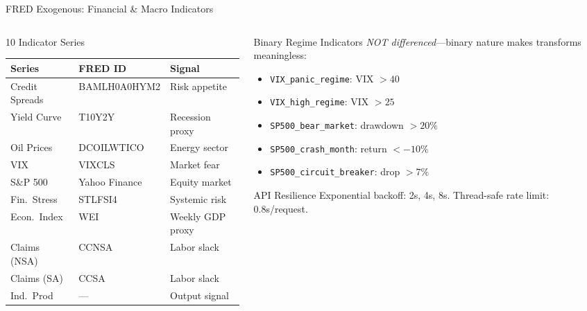 \documentclass[aspectratio=169,10pt]{beamer}
\begin{document}
\begin{frame}{FRED Exogenous: Financial \& Macro Indicators}
\begin{columns}[T]
\begin{column}{0.52\textwidth}
\begin{block}{10 Indicator Series}
\scriptsize
\begin{tabular}{@{}lll@{}}
\toprule
\textbf{Series} & \textbf{FRED ID} & \textbf{Signal} \\
\midrule
Credit Spreads & BAMLH0A0HYM2 & Risk appetite \\
Yield Curve & T10Y2Y & Recession proxy \\
Oil Prices & DCOILWTICO & Energy sector \\
VIX & VIXCLS & Market fear \\
S\&P 500 & Yahoo Finance & Equity market \\
Fin.\ Stress & STLFSI4 & Systemic risk \\
Econ.\ Index & WEI & Weekly GDP proxy \\
Claims (NSA) & CCNSA & Labor slack \\
Claims (SA) & CCSA & Labor slack \\
Ind.\ Prod & --- & Output signal \\
\bottomrule
\end{tabular}
\end{block}
\end{column}
\begin{column}{0.45\textwidth}
\begin{block}{Binary Regime Indicators}
\scriptsize
\emph{NOT differenced}---binary nature makes transforms meaningless:
\begin{itemize}
  \item \texttt{VIX\_panic\_regime}: VIX $> 40$
  \item \texttt{VIX\_high\_regime}: VIX $> 25$
  \item \texttt{SP500\_bear\_market}: drawdown $> 20\%$
  \item \texttt{SP500\_crash\_month}: return $< -10\%$
  \item \texttt{SP500\_circuit\_breaker}: drop $> 7\%$
\end{itemize}
\end{block}
\vspace{0.1cm}
\begin{exampleblock}{API Resilience}
\scriptsize
Exponential backoff: 2s, 4s, 8s. Thread-safe rate limit: 0.8s/request.
\end{exampleblock}
\end{column}
\end{columns}
\end{frame}
\end{document}
